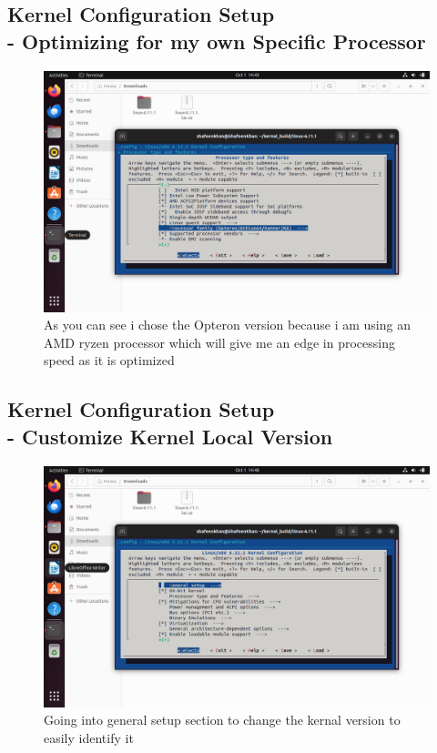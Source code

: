 \documentclass{article}
\begin{document}
\subsection{Kernel Configuration Setup \\- Optimizing for my own Specific Processor}
\begin{figure}[H]
    \centering
    \includegraphics[width=0.8\linewidth]{57.jpg}
    \caption{As you can see i chose the Opteron version because i am using an AMD ryzen processor which will give me an edge in processing speed as it is optimized }
\end{figure}


\subsection{Kernel Configuration Setup\\ - Customize Kernel Local Version}
\begin{figure}[H]
    \centering
    \includegraphics[width=0.8\linewidth]{56.jpg}
    \caption{Going into general setup section to change the kernal version to easily identify it}
\end{figure}
\end{document}
